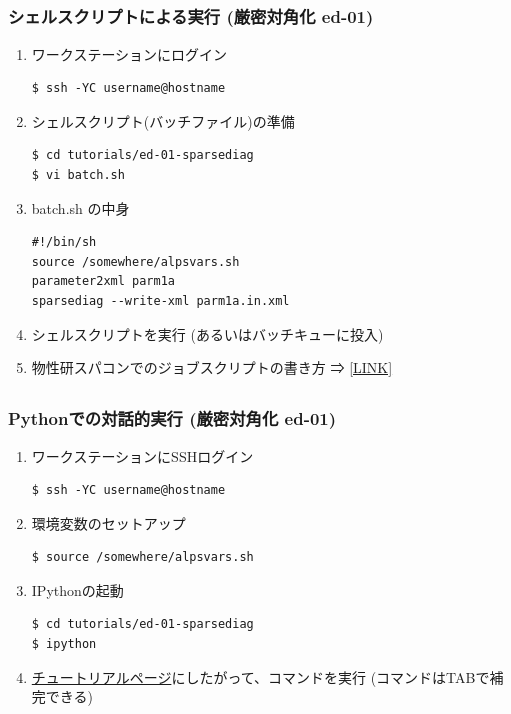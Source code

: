 \subsection*{\redm\whitem\greenb}
\begin{frame}[t,fragile]
  \frametitle{シェルスクリプトによる実行 (厳密対角化 ed-01)}
  \begin{enumerate}
  \item ワークステーションにログイン
\begin{lstlisting}
$ ssh -YC username@hostname
\end{lstlisting}
  \item シェルスクリプト(バッチファイル)の準備
\begin{lstlisting}
$ cd tutorials/ed-01-sparsediag
$ vi batch.sh
\end{lstlisting}
  \item batch.sh の中身
\begin{lstlisting}
#!/bin/sh
source /somewhere/alpsvars.sh
parameter2xml parm1a
sparsediag --write-xml parm1a.in.xml
\end{lstlisting}
  \item シェルスクリプトを実行 (あるいはバッチキューに投入)
  \item 物性研スパコンでのジョブスクリプトの書き方 ⇒ \href{http://www.issp.u-tokyo.ac.jp/supercom/for-users/x92nxz/alps}{[LINK]}
  \end{enumerate}
\end{frame}

\subsection*{\redm\whitem\greenb}
\begin{frame}[t,fragile]
  \frametitle{Pythonでの対話的実行 (厳密対角化 ed-01)}
  \begin{enumerate}
  \item ワークステーションにSSHログイン
\begin{lstlisting}
$ ssh -YC username@hostname
\end{lstlisting}
  \item 環境変数のセットアップ
\begin{lstlisting}
$ source /somewhere/alpsvars.sh
\end{lstlisting}
  \item IPythonの起動
\begin{lstlisting}
$ cd tutorials/ed-01-sparsediag
$ ipython
\end{lstlisting}
  \item \href{http://alps.comp-phys.org/mediawiki/index.php/ALPS_2_Tutorials:ED-01_SparseDiagonalization/ja#Python.E3.81.A7.E3.81.AE.E5.AE.9F.E8.A1.8C}{チュートリアルページ}にしたがって、コマンドを実行 (コマンドはTABで補完できる)
  \end{enumerate}
\end{frame}

